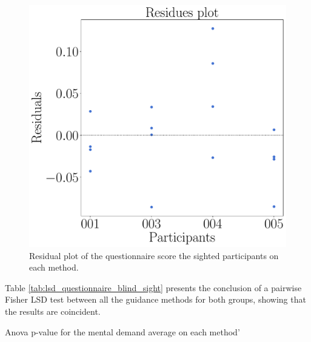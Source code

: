\begin{figure}[!htb]
    \begin{minipage}{0.45\textwidth}
        \centering
        \includegraphics[width = \textwidth]{Resultados/Questionario/Figuras/pdf/residplot_questionnaire_sight.pdf}
        \caption{Residual plot of the questionnaire score the sighted participants on each method.}
        \label{fig:residplot_questionnaire_sight}
    \end{minipage}
\end{figure}

Table \ref{tab:lsd_questionnaire_blind_sight} presents the conclusion of a pairwise Fisher LSD test between all the guidance methods for both groups, showing that the results are coincident.

\FloatBarrier

\begin{table}[!thb]
    \caption{Anova p-value for the mental demand average on each method'}
    \label{tab:lsd_questionnaire_blind_sight}
    \begin{minipage}{1\textwidth}
        
    \end{minipage}
    \begin{minipage}{1\textwidth}
        
    \end{minipage}
\end{table}

